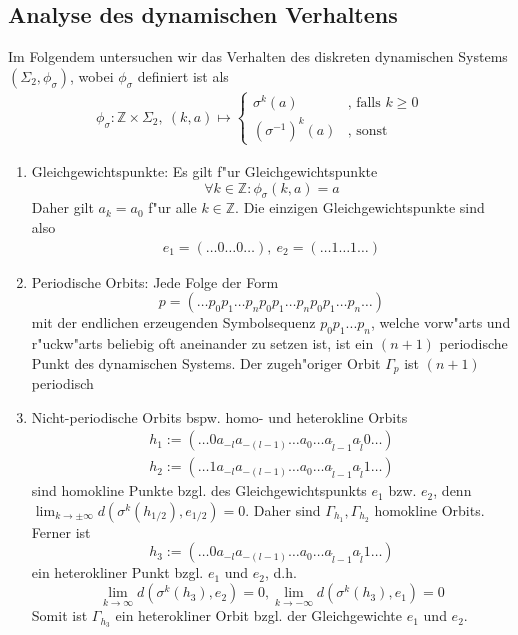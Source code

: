 \documentclass[a4paper, 13pt]{scrreprt}
\theoremstyle{definition} \newtheorem{definition}{Definition}[section]
\begin{document}
\subsection{Analyse des dynamischen Verhaltens}
Im Folgendem untersuchen wir das Verhalten des diskreten dynamischen Systems $(\Sigma_2, \phi_\sigma)$, wobei $\phi_\sigma$ definiert ist als
\begin{align*}
	\phi_\sigma\colon\mathbb{Z}\times\Sigma_2, \ (k, a) \mapsto 
	\begin{cases}
		\sigma^{k}(a) &\mbox{, falls } k \geq 0 \\
		(\sigma^{-1})^{k}(a) &\mbox{, sonst}
	\end{cases}
\end{align*}
\begin{enumerate}
	\item{Gleichgewichtspunkte:}
	Es gilt f"ur Gleichgewichtspunkte
	$$ \forall k \in \mathbb{Z}: \phi_\sigma(k, a) = a $$
	Daher gilt $a_k = a_0$ f"ur alle $k \in \mathbb{Z}$. Die einzigen Gleichgewichtspunkte sind also 
		\begin{align*}
			e_1=(\ldots 0\ldots 0\ldots),\  e_2=(\ldots 1\ldots 1\ldots)
		\end{align*}
	\item{Periodische Orbits:} Jede Folge der Form
		\[p=(\ldots p_0p_1\ldots p_np_0p_1\ldots p_np_0p_1\ldots p_n\ldots) \]
		mit der endlichen erzeugenden Symbolsequenz \(p_0p_1...p_n\), welche vorw"arts und r"uckw"arts beliebig oft aneinander zu setzen ist, ist ein \((n+1)\) periodische Punkt des dynamischen Systems.
		Der zugeh"origer Orbit \(\Gamma_p\) ist \((n+1)\) periodisch
		
	\item{Nicht-periodische Orbits} bspw. homo- und heterokline Orbits\\
		\begin{align*}
			h_1 := (\ldots 0a_{-l}a_{-(l-1)}\ldots a_0\ldots a_{\tilde{l}-1}a_{\tilde{l}}0\ldots ) \\
		  		h_2:=(\ldots 1a_{-l}a_{-(l-1)}\ldots a_0\ldots a_{\tilde{l}-1}a_{\tilde{l}}1\ldots )
		\end{align*}
		 sind homokline Punkte bzgl. des Gleichgewichtspunkts \(e_1\) bzw. \(e_2\), denn \(\lim_{k\to\pm\infty} d(\sigma^k(h_{1/2}),e_{1/2}) = 0\). Daher sind \(\Gamma_{h_1}, \Gamma_{h_2}\) homokline Orbits. Ferner ist 
		 \[h_3:=(\ldots 0a_{-l}a_{-(l-1)}\ldots a_0\ldots a_{\tilde{l}-1}a_{\tilde{l}}1\ldots )\] 
		 ein heterokliner Punkt bzgl. \(e_1\) und \(e_2\), d.h. 
		\[\lim_{k\to\infty} d(\sigma^k(h_3),e_2) = 0, \lim_{k\to -\infty} d(\sigma^k(h_3),e_1)=0\]
		Somit ist \( \Gamma_{h_3}\) ein heterokliner Orbit bzgl. der Gleichgewichte \(e_1\) und \(e_2\).
\end{enumerate}
\end{document}
